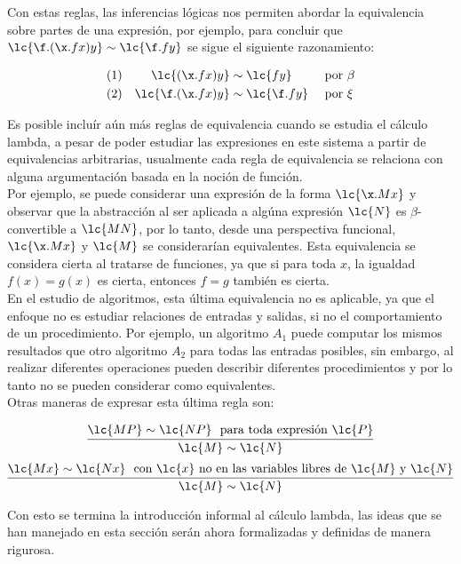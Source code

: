 Con estas reglas, las inferencias lógicas nos permiten abordar la equivalencia
sobre partes de una expresión, por ejemplo, para concluir que \(\lc{\f.(\x.f
  x)y} \sim \lc{\f.f y}\) se sigue el siguiente razonamiento:

\begin{align*}
  (1)& &\lc{(\x.f x)y} &\sim \lc{f y} & &\text{ por \(\beta\)} \\
  (2)& &\lc{\f.(\x.f x)y} &\sim \lc{\f.f y} & &\text{ por \(\xi\)}
\end{align*}

Es posible incluír aún más reglas de equivalencia cuando se estudia el cálculo
lambda, a pesar de poder estudiar las expresiones en este sistema a partir de
equivalencias arbitrarias, usualmente cada regla de equivalencia se relaciona
con alguna argumentación basada en la noción de función. \\

Por ejemplo, se puede considerar una expresión de la forma \(\lc{\x.M x}\) y
observar que la abstracción al ser aplicada a algúna expresión \(\lc{N}\) es
\(\beta\)-convertible a \(\lc{M N}\), por lo tanto, desde una perspectiva
funcional, \(\lc{\x.M x}\) y \(\lc{M}\) se considerarían equivalentes. Esta
equivalencia se considera cierta al tratarse de funciones, ya que si para toda \(x\),
la igualdad \(f(x) = g(x)\) es cierta, entonces \(f = g\) también es cierta. \\

En el estudio de algoritmos, esta última equivalencia no es aplicable, ya que el
enfoque no es estudiar relaciones de entradas y salidas, si no el comportamiento
de un procedimiento. Por ejemplo, un algoritmo \(A_{1}\) puede computar los
mismos resultados que otro algoritmo \(A_{2}\) para todas las entradas posibles,
sin embargo, al realizar diferentes operaciones pueden describir diferentes
procedimientos y por lo tanto no se pueden considerar como equivalentes. \\

Otras maneras de expresar esta última regla son:

\[\infer{\lc{M} \sim \lc{N}}{\lc{M P} \sim \lc{N P}\ \text{ para toda expresión
      \(\lc{P}\)}}\]
\[\infer{\lc{M} \sim \lc{N}}{\lc{M x} \sim \lc{N x}\ \text{ con \(\lc{x}\) no en las variables
      libres de \(\lc{M}\) y \(\lc{N}\)}}\]

Con esto se termina la introducción informal al cálculo lambda, las ideas que se
han manejado en esta sección serán ahora formalizadas y definidas de manera
rigurosa. \\

